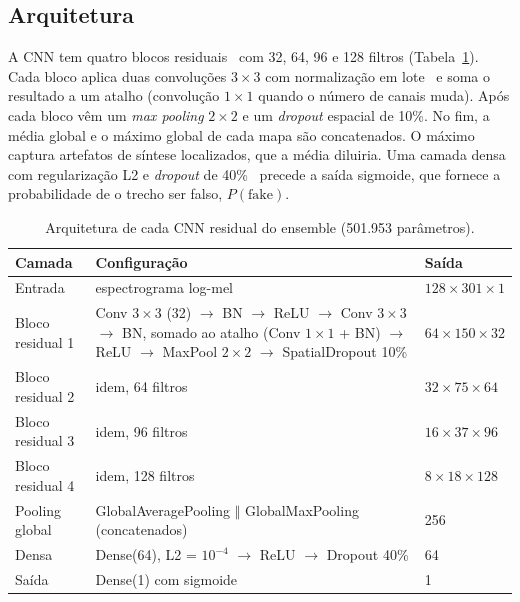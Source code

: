 \subsection{Arquitetura}

A CNN tem quatro blocos residuais~\citep{he2016resnet} com 32, 64, 96 e 128 filtros (Tabela~\ref{tab:arquitetura}). Cada bloco aplica duas convoluções $3 \times 3$ com normalização em lote~\citep{ioffe2015batchnorm} e soma o resultado a um atalho (convolução $1 \times 1$ quando o número de canais muda). Após cada bloco vêm um \textit{max pooling} $2 \times 2$ e um \textit{dropout} espacial de 10\%. No fim, a média global e o máximo global de cada mapa são concatenados. O máximo captura artefatos de síntese localizados, que a média diluiria. Uma camada densa com regularização L2 e \textit{dropout} de 40\%~\citep{srivastava2014dropout} precede a saída sigmoide, que fornece a probabilidade de o trecho ser falso, $P(\text{fake})$.

\begin{table}[!ht]
\caption{Arquitetura de cada CNN residual do ensemble (501.953 parâmetros).}
\centering
\small
\begin{tabular}{@{}p{3.2cm}p{9.6cm}p{2.6cm}@{}}
\hline\hline
Camada & Configuração & Saída \\
\hline
Entrada & espectrograma log-mel & $128 \times 301 \times 1$ \\
Bloco residual 1 & Conv $3 \times 3$ (32) $\rightarrow$ BN $\rightarrow$ ReLU $\rightarrow$ Conv $3 \times 3$ $\rightarrow$ BN, somado ao atalho (Conv $1 \times 1$ + BN) $\rightarrow$ ReLU $\rightarrow$ MaxPool $2 \times 2$ $\rightarrow$ SpatialDropout 10\% & $64 \times 150 \times 32$ \\
Bloco residual 2 & idem, 64 filtros & $32 \times 75 \times 64$ \\
Bloco residual 3 & idem, 96 filtros & $16 \times 37 \times 96$ \\
Bloco residual 4 & idem, 128 filtros & $8 \times 18 \times 128$ \\
Pooling global & GlobalAveragePooling $\Vert$ GlobalMaxPooling (concatenados) & 256 \\
Densa & Dense(64), L2 = $10^{-4}$ $\rightarrow$ ReLU $\rightarrow$ Dropout 40\% & 64 \\
Saída & Dense(1) com sigmoide & 1 \\
\hline\hline
\end{tabular}
\label{tab:arquitetura}
\end{table}

